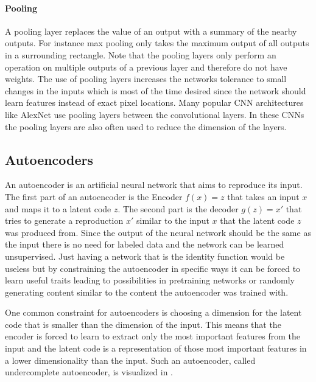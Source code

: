 \paragraph{Pooling}
A pooling layer replaces the value of an output with a summary of the nearby outputs. For instance
max pooling only takes the maximum output of all outputs in a surrounding rectangle. Note that
the pooling layers only perform an operation on multiple outputs of a previous layer and therefore
do not have weights. The use of pooling layers increases the networks tolerance to small changes in
the inputs \parencite{2016-goodfellow-deep} which is most of the time desired since the network should
learn features instead of exact pixel locations. Many popular CNN architectures like 
AlexNet \parencite{2012-krizhevsky-imagenet} use pooling layers between the convolutional layers.
In these CNNs the pooling layers are also often used to reduce the dimension of the layers.




\subsection{Autoencoders}

An autoencoder is an artificial neural network that aims to reproduce its input. The first part
of an autoencoder is the Encoder $f(x)=z$ that takes an input $x$ and maps it to a latent code $z$.
The second part is the decoder $g(z)=x'$ that tries to generate a reproduction $x'$ similar to the
input $x$ that the latent code $z$ was produced from. Since the output of the neural network should
be the same as the input there is no need for labeled data and the network can be learned unsupervised.
Just having a network that is the identity function would be useless but by constraining the autoencoder
in specific ways it can be forced to learn useful traits leading to possibilities in pretraining 
networks or randomly generating content similar to the content the autoencoder was trained with.

One common constraint for autoencoders is choosing a dimension for the latent code that is smaller
than the dimension of the input. This means that the encoder is forced to learn to extract only the
most important features from the input and the latent code is a representation of those most
important features in a lower dimensionality than the input. Such an autoencoder, called
undercomplete autoencoder, is visualized in .

